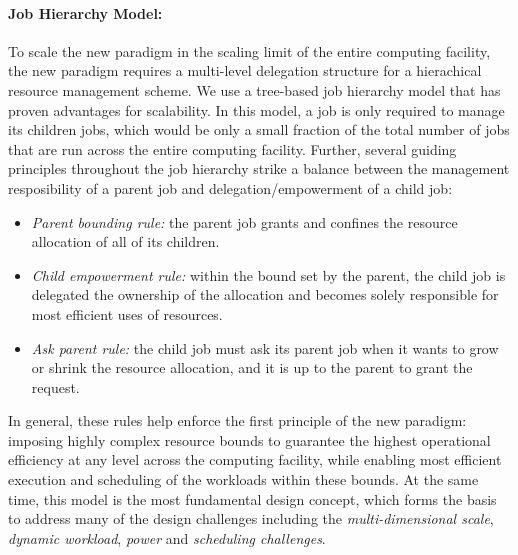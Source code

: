 \documentclass{article}
\begin{document}
\paragraph{Job Hierarchy Model:}
To scale the new paradigm in the scaling limit of the entire computing facility,
the new paradigm requires a multi-level delegation structure for a hierachical 
resource management scheme. We use a tree-based job hierarchy model
that has proven advantages for scalability. 
In this model, a job is only required to manage its children jobs,
which would be only a small fraction of the total number of jobs that are run
across the entire computing facility. Further, several guiding principles
throughout the job hierarchy strike a balance between the management
resposibility of a parent job and delegation/empowerment of a child job:
\begin{itemize}
\item{\sl Parent bounding rule:} the parent job grants and confines
     the resource allocation of all of its children.
\item{\sl Child empowerment rule:} within the bound set by the parent,
     the child job is delegated the ownership of the allocation
     and becomes solely responsible for most efficient uses of resources.
\item{\sl Ask parent rule:} the child job must ask its parent job
     when it wants to grow or shrink the resource allocation, 
     and it is up to the parent to grant the request.                   
\end{itemize}
In general, these rules help enforce the first principle of the new paradigm: 
imposing highly complex resource bounds to guarantee the highest operational efficiency
at any level across the computing facility, while enabling most efficient execution
and scheduling of the workloads within these bounds.
At the same time, this model is the most fundamental design concept,
which forms the basis to address many of the design challenges including 
the {\sl multi-dimensional scale}, {\sl dynamic workload}, {\sl power} and
{\sl scheduling challenges}. 
\end{document}
